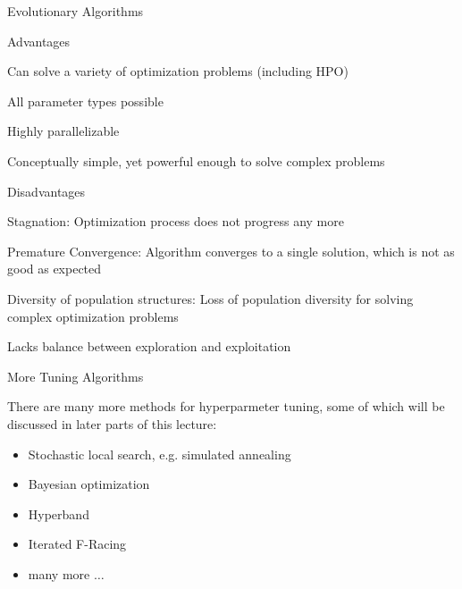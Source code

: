 \begin{frame}{Evolutionary Algorithms}

  \begin{blocki}{Advantages}
    \item Can solve a variety of optimization problems (including HPO)
    \item All parameter types possible
    \item Highly parallelizable
    \item Conceptually simple, yet powerful enough to solve complex problems
    \end{blocki}

    \begin{blocki}{Disadvantages}
    \item Stagnation: Optimization process does not progress any more %
    \item Premature Convergence: Algorithm converges to a single solution, which is not as good as expected
    \item Diversity of population structures: Loss of population diversity for solving complex optimization problems
    \item Lacks balance between exploration and exploitation
    \end{blocki}

\end{frame}

\begin{frame}{More Tuning Algorithms}

There are many more methods for hyperparmeter tuning, some of which will be discussed in later parts of this lecture:


\begin{itemize}
\item Stochastic local search, e.g. simulated annealing
\item Bayesian optimization
\item Hyperband
\item Iterated F-Racing
\item many more $\dots$
\end{itemize}

\end{frame}


